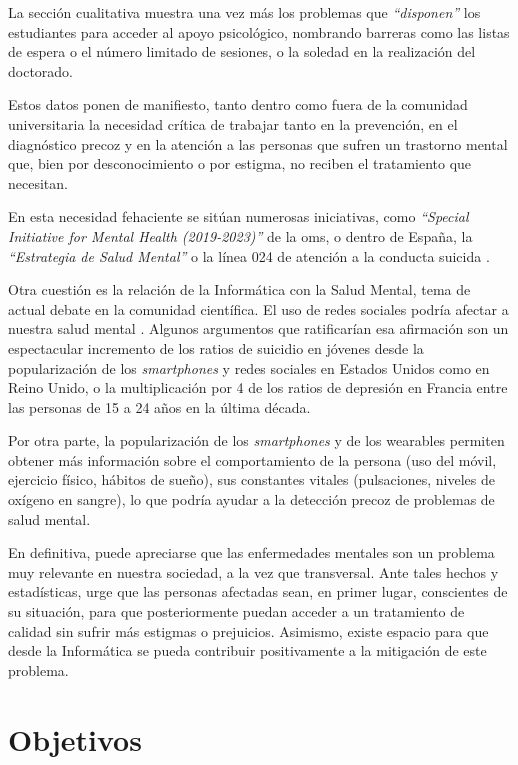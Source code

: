     La sección cualitativa muestra una vez más los problemas que\textit{ ``disponen''} los estudiantes para acceder al apoyo psicológico, nombrando barreras como las listas de espera o el número limitado de sesiones, o la soledad en la realización del doctorado.
    
    Estos datos ponen de manifiesto, tanto dentro como fuera de la comunidad universitaria la necesidad crítica de trabajar tanto en la prevención, en el diagnóstico precoz y en la atención a las personas que sufren un trastorno mental que, bien por desconocimiento o por estigma, no reciben el tratamiento que necesitan.
    
    En esta necesidad fehaciente se sitúan numerosas iniciativas, como \textit{``Special Initiative for Mental Health (2019-2023)''} \cite{oms_salud_nodate} de la \gls{oms}, o dentro de España, la \textit{``Estrategia de Salud Mental''} o la línea 024 de atención a la conducta suicida \cite{la_moncloa_minones_2023}.

    Otra cuestión es la relación de la Informática con la Salud Mental, tema de actual debate en la comunidad científica. El uso de redes sociales podría afectar a nuestra salud mental \cite{burn-murdoch_smartphones_2023}. Algunos argumentos que ratificarían esa afirmación son un espectacular incremento de los ratios de suicidio en jóvenes desde la popularización de los \textit{smartphones} y redes sociales en Estados Unidos como en Reino Unido, o la multiplicación por 4 de los ratios de depresión en Francia entre las personas de 15 a 24 años en la última década.
    
    Por otra parte, la popularización de los \textit{smartphones} y de los \glspl{wearable} permiten obtener más información sobre el comportamiento de la persona (uso del móvil, ejercicio físico, hábitos de sueño), sus constantes vitales (pulsaciones, niveles de oxígeno en sangre), lo que podría ayudar a la detección precoz de problemas de salud mental.
    
    En definitiva, puede apreciarse que las enfermedades mentales son un problema muy relevante en nuestra sociedad, a la vez que transversal. Ante tales hechos y estadísticas, urge que las personas afectadas sean, en primer lugar, conscientes de su situación, para que posteriormente puedan acceder a un tratamiento de calidad sin sufrir más estigmas o prejuicios. Asimismo, existe espacio para que desde la Informática se pueda contribuir positivamente a la mitigación de este problema.
    
\section{Objetivos}
    \label{sec:objetivos}

